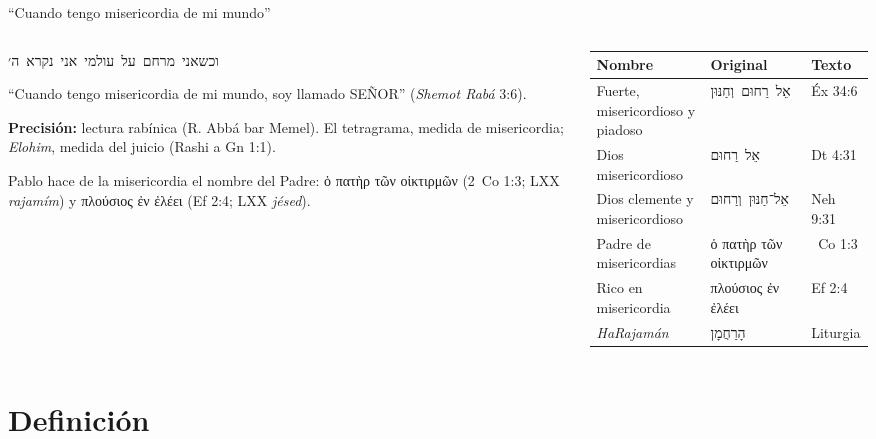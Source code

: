 \documentclass[hyperref={bookmarks=false},aspectratio=169]{beamer}
\newcommand{\heb}[1]{\mbox{\foreignlanguage{hebrew}{#1}}}
\newcommand{\grc}[1]{\foreignlanguage{ancientgreek}{#1}}
\newcommand{\SENOR}{S{\fontsize{0.78em}{1em}\selectfont EÑOR}}
\newcommand{\precision}[1]{{\footnotesize\color{gris}\textbf{Precisión:} #1}}
\begin{document}
\begin{frame}{``Cuando tengo misericordia de mi mundo''}
\begin{columns}[c,onlytextwidth]
\begin{column}{0.46\textwidth}
\begin{center}\heb{וכשאני מרחם על עולמי אני נקרא ה׳}\end{center}
\small ``Cuando tengo misericordia de mi mundo, soy llamado \SENOR{}'' (\emph{Shemot Rabá} 3:6).\par\smallskip
\precision{lectura rabínica (R. Abbá bar Memel). El tetragrama, medida de misericordia; \emph{Elohim}, medida del juicio (Rashi a Gn 1:1).}\par\medskip
\small Pablo hace de la misericordia el nombre del Padre: \grc{ὁ πατὴρ τῶν οἰκτιρμῶν} (2~Co 1:3; LXX \emph{rajamím}) y \grc{πλούσιος ἐν ἐλέει} (Ef 2:4; LXX \emph{jésed}).
\end{column}
\begin{column}{0.52\textwidth}\scriptsize
\renewcommand{\arraystretch}{1.15}
\begin{tabular}{@{}>{\RaggedRight\arraybackslash}p{2.6cm}>{\RaggedRight\arraybackslash}p{2.2cm}>{\RaggedRight\arraybackslash}p{1.6cm}@{}}
\toprule
\textbf{Nombre} & \textbf{Original} & \textbf{Texto} \\ \midrule
Fuerte, misericordioso y piadoso & \heb{אֵל רַחוּם וְחַנּוּן} & Éx 34:6 \\
Dios misericordioso & \heb{אֵל רַחוּם} & Dt 4:31 \\
Dios clemente y misericordioso & \heb{אֵל־חַנּוּן וְרַחוּם} & Neh 9:31 \\
Padre de misericordias & \grc{ὁ πατὴρ τῶν οἰκτιρμῶν} & 2~Co 1:3 \\
Rico en misericordia & \grc{πλούσιος ἐν ἐλέει} & Ef 2:4 \\
\emph{HaRajamán} & \heb{הָרַחֲמָן} & Liturgia \\
\bottomrule
\end{tabular}
\end{column}
\end{columns}
\end{frame}

\section{Definición}
\end{document}
